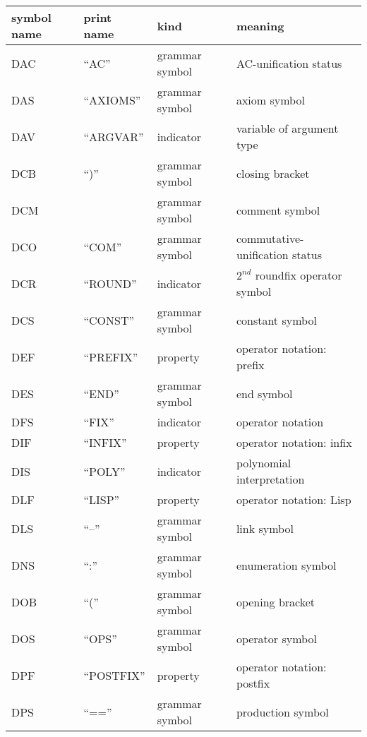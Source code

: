 \begin{table}
\begin{center}
\begin{tabular}{|l|l|l|l|}
 \hline
 symbol name & print name & kind & meaning\\
 \hline\hline
  DAC        & ``AC''     & grammar symbol & AC-unification status \\
  DAS        & ``AXIOMS'' & grammar symbol & axiom symbol \\
  DAV        & ``ARGVAR'' & indicator      & variable of argument type \\
  DCB        & ``)''      & grammar symbol & closing bracket \\
  DCM        &            & grammar symbol & comment symbol \\
  DCO        & ``COM''    &  grammar symbol & commutative-unification status \\
  DCR        & ``ROUND''  & indicator      & $2^{nd}$ roundfix 
                                             operator symbol \\
  DCS        & ``CONST''  & grammar symbol & constant symbol \\
  DEF        & ``PREFIX'' & property       & operator notation: prefix \\
  DES        & ``END''    & grammar symbol & end symbol \\
  DFS        & ``FIX''    & indicator      & operator notation \\
  DIF        & ``INFIX''  & property       & operator notation: infix \\
  DIS        & ``POLY''   & indicator      & polynomial interpretation \\
  DLF        & ``LISP''   & property       & operator notation: Lisp \\
  DLS        & ``--''     & grammar symbol & link symbol \\ 
  DNS        & ``:''      & grammar symbol & enumeration symbol \\  
  DOB        & ``(''      & grammar symbol & opening bracket \\ 
  DOS        & ``OPS''    & grammar symbol & operator symbol \\  
  DPF        & ``POSTFIX'' & property       & operator notation: postfix \\
  DPS        & ``==''     & grammar symbol & production symbol \\   

\end{tabular}
\end{center}
\end{table}
